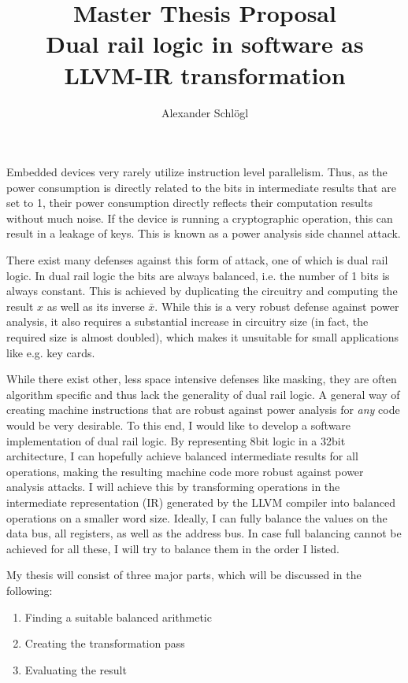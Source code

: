 \documentclass{article}
\title{%
	Master Thesis Proposal\\
	\large Dual rail logic in software as LLVM-IR transformation}
\author{Alexander Schl\"ogl}
\begin{document}
\maketitle

Embedded devices very rarely utilize instruction level parallelism.
Thus, as the power consumption is directly related to the bits in intermediate results that are set to 1, their power consumption directly reflects their computation results without much noise.
If the device is running a cryptographic operation, this can result in a leakage of keys.
This is known as a power analysis side channel attack. \cite{kocher1999differential}

There exist many defenses against this form of attack, one of which is dual rail logic. \cite{sokolov2005design}
In dual rail logic the bits are always balanced, i.e. the number of 1 bits is always constant.
This is achieved by duplicating the circuitry and computing the result $x$ as well as its inverse $\bar{x}$.
While this is a very robust defense against power analysis, it also requires a substantial increase in circuitry size (in fact, the required size is almost doubled), which makes it unsuitable for small applications like e.g. key cards.

While there exist other, less space intensive defenses like masking, they are often algorithm specific and thus lack the generality of dual rail logic.
A general way of creating machine instructions that are robust against power analysis for \emph{any} code would be very desirable.
To this end, I would like to develop a software implementation of dual rail logic.
By representing 8bit logic in a 32bit architecture, I can hopefully achieve balanced intermediate results for all operations, making the resulting machine code more robust against power analysis attacks.
I will achieve this by transforming operations in the intermediate representation (IR) generated by the LLVM compiler into balanced operations on a smaller word size.
Ideally, I can fully balance the values on the data bus, all registers, as well as the address bus.
In case full balancing cannot be achieved for all these, I will try to balance them in the order I listed.

My thesis will consist of three major parts, which will be discussed in the following:
\begin{enumerate}
	\item Finding a suitable balanced arithmetic
	\item Creating the transformation pass
	\item Evaluating the result
\end{enumerate}
\end{document}
